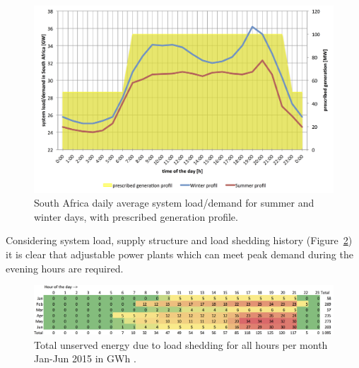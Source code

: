\begin{figure}[htbp]  
\centering
\includegraphics[width=1\linewidth]{FIG/LoadScenarios}
\caption[South Africa daily average system load/demand for summer and winter days, with prescribed generation profile.]{South Africa daily average system load/demand for summer and winter days, with prescribed generation profile.}\label{LoadScenarios}
\end{figure}
Considering system load, supply structure and load shedding history (Figure~\ref{Load_shedding_sum}) it is clear that adjustable power plants which can meet peak demand during the evening hours are required. 

\begin{figure}[htbp]  
\centering
\includegraphics[width=1\linewidth]{FIG/Load_shedding_sum}
\caption[Total unserved energy due to load shedding for all hours per month Jan-Jun 2015 in GWh.]{Total unserved energy due to load shedding for all hours per month Jan-Jun 2015 in GWh \cite{CSIREnergyCentre2015}.}\label{Load_shedding_sum}
\end{figure}

